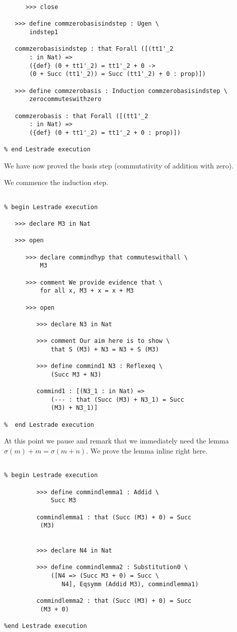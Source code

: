 \documentclass[12pt]{article}
\begin{document}
\begin{verbatim}
      >>> close

   >>> define commzerobasisindstep : Ugen \
       indstep1

   commzerobasisindstep : that Forall ([(tt1'_2 
       : in Nat) => 
       ({def} (0 + tt1'_2) = tt1'_2 + 0 -> 
       (0 + Succ (tt1'_2)) = Succ (tt1'_2) + 0 : prop)])

   >>> define commzerobasis : Induction commzerobasisindstep \
       zerocommuteswithzero

   commzerobasis : that Forall ([(tt1'_2 
       : in Nat) => 
       ({def} (0 + tt1'_2) = tt1'_2 + 0 : prop)])

% end Lestrade execution
\end{verbatim}

We have now proved the basis step (commutativity of addition with zero).

We commence the induction step.

\begin{verbatim}

% begin Lestrade execution

   >>> declare M3 in Nat

   >>> open

      >>> declare commindhyp that commuteswithall \
          M3

      >>> comment We provide evidence that \
          for all x, M3 + x = x + M3

      >>> open

         >>> declare N3 in Nat

         >>> comment Our aim here is to show \
             that S (M3) + N3 = N3 + S (M3)

         >>> define commind1 N3 : Reflexeq \
             (Succ M3 + N3)

         commind1 : [(N3_1 : in Nat) => 
             (--- : that (Succ (M3) + N3_1) = Succ 
             (M3) + N3_1)]

%  end Lestrade execution
\end{verbatim}

At this point we pause and remark that we immediately need the lemma $\sigma(m)+m = \sigma(m+n)$.  We prove the lemma inline right here.

\begin{verbatim}

% begin Lestrade execution

         >>> define commindlemma1 : Addid \
             Succ M3

         commindlemma1 : that (Succ (M3) + 0) = Succ 
          (M3)


         >>> declare N4 in Nat

         >>> define commindlemma2 : Substitution0 \
             ([N4 => (Succ M3 + 0) = Succ \
                N4], Eqsymm (Addid M3), commindlemma1)

         commindlemma2 : that (Succ (M3) + 0) = Succ 
          (M3 + 0)

%end Lestrade execution
\end{verbatim}
\end{document}
